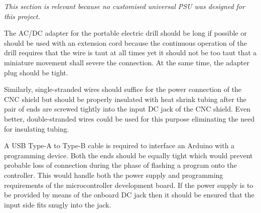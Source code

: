\textit{This section is relevant because no customised universal PSU was designed for this project.}

The AC/DC adapter for the portable electric drill should be long if possible or should be used with an extension cord because the continuous operation of the drill requires that the wire is taut at all times yet it should not be too taut that a miniature movement shall severe the connection. At the same time, the adapter plug should be tight. \par

Similarly, single-stranded wires should suffice for the power connection of the CNC shield but should be properly insulated with heat shrink tubing after the pair of ends are screwed tightly into the input DC jack of the CNC shield. Even better, double-stranded wires could be used for this purpose eliminating the need for insulating tubing. \par

A USB Type-A to Type-B cable is required to interface an Arduino with a programming device. Both the ends should be equally tight which would prevent probable loss of connection during the phase of flashing a program onto the controller. This would handle both the power supply and programming requirements of the microcontroller development board. If the power supply is to be provided by means of the onboard DC jack then it should be ensured that the input side fits snugly into the jack.
